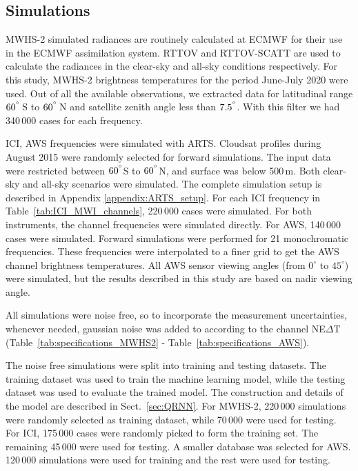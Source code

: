 \documentclass[amt, manuscript]{copernicus}
\begin{document}
\subsection{Simulations}
%
MWHS-2 simulated radiances are routinely calculated at ECMWF for their use in the ECMWF assimilation system. RTTOV and RTTOV-SCATT are used to calculate the radiances in the clear-sky and all-sky conditions respectively. For this study, MWHS-2 brightness temperatures for the period June-July 2020 were used. Out of all the available observations, we extracted data for latitudinal range $60^{^{\circ}}$\,S to $60^{^{\circ}}$\,N and satellite zenith angle less than $7.5^{^{\circ}}$. With this filter we had 340\,000 cases for each frequency. 

ICI, AWS frequencies were simulated with ARTS. Cloudsat profiles during August 2015 were randomly selected for forward simulations. The input data were restricted between $60^{^{\circ}}$S to $60^{^{\circ}}$N, and surface was below 500\,m. Both clear-sky and all-sky scenarios were simulated. The complete simulation setup is described in Appendix \ref{appendix:ARTS_setup}. For each ICI frequency in Table~\ref{tab:ICI_MWI_channels}, 220\,000 cases were simulated. For both instruments, the channel frequencies were simulated directly. For AWS, 140\,000 cases were simulated. Forward simulations were performed for 21 monochromatic frequencies. These frequencies were interpolated to a finer grid to get the AWS channel brightness temperatures. All AWS sensor viewing angles (from $0^\circ$ to $45^\circ$) were simulated, but the results described in this study are based on nadir viewing angle. 

All simulations were noise free, so to incorporate the measurement uncertainties, whenever needed, gaussian noise was added to according to the channel NE$\Delta$T (Table~\ref{tab:specifications_MWHS2} - Table~\ref{tab:specifications_AWS}).

The noise free simulations were split into training and testing datasets. The training dataset was used to train the machine learning model, while the testing dataset was used to evaluate the trained model. The construction and details of the model are described in Sect.~\ref{sec:QRNN}. For MWHS-2, 220\,000 simulations were randomly selected as training dataset, while 70\,000 were used for testing. For ICI, 175\,000 cases were randomly picked to form the training set. The remaining 45\,000 were used for testing. A smaller database was selected for AWS. 120\,000 simulations were used for training and the rest were used for testing.
\end{document}
